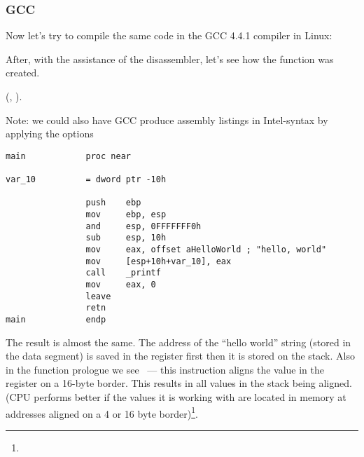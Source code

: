 \subsubsection{GCC}

{Now let's try to compile the same \CCpp code in the GCC 4.4.1 compiler in Linux}: 

{After, with the assistance of the \IDA disassembler, let's see how the \main function was created.} 

(\IDA, ).

{Note: we could also have GCC produce assembly listings in Intel-syntax by applying the options} 

\begin{lstlisting}[caption=GCC]
main            proc near

var_10          = dword ptr -10h

                push    ebp
                mov     ebp, esp
                and     esp, 0FFFFFFF0h
                sub     esp, 10h
                mov     eax, offset aHelloWorld ; "hello, world"
                mov     [esp+10h+var_10], eax
                call    _printf
                mov     eax, 0
                leave
                retn
main            endp
\end{lstlisting}

{The result is almost the same.
The address of the ``hello world'' string (stored in the data segment) is saved in the \EAX register first then it is stored on the stack.
Also in the function prologue we see  ~--- 
this instruction aligns the value in the \ESP register on a 16-byte border.
This results in all values in the stack being aligned.
(CPU performs better if the values it is working with are located in memory at addresses aligned 
on a 4 or 16 byte border)\footnote{\URLWPDA}.}

